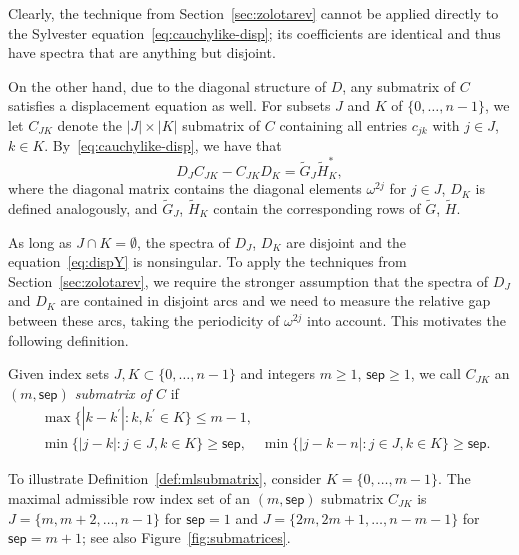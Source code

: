 \documentclass[final,reqno,onefignum,onetabnum]{siamart190516}
\newcommand{\sep}{\mathsf{sep}}
\begin{document}
Clearly, the technique from Section~\ref{sec:zolotarev} cannot be applied directly to the Sylvester equation~\eqref{eq:cauchylike-disp}; its coefficients are identical and thus have spectra that are anything but disjoint. 

On the other hand, due to the diagonal structure of $D$, any submatrix of $C$ satisfies a displacement equation as well. For subsets $J$ and $K$ of $\{0,\ldots,n\!-\!1\}$, we let $C_{JK}$ denote the $|J|\times |K|$ submatrix of $C$ containing all entries $c_{jk}$ with $j\in J$, $k \in K$.
By~\eqref{eq:cauchylike-disp}, we have that
\begin{equation}
\label{eq:dispY}
 D_J C_{JK} - C_{JK} D_K = \widetilde{G}_J \widetilde{H}_K^*,
\end{equation} 
where the diagonal matrix  contains the diagonal elements $\omega^{2j}$ for $j\in J$, $D_K$ is defined analogously, and 
$\widetilde{G}_J$, $\widetilde{H}_K$ contain the corresponding rows of 
$\widetilde{G}$, $\widetilde{H}$.

As long as $J \cap K = \emptyset$, the spectra of $D_J$, $D_K$ are disjoint and the equation~\eqref{eq:dispY} is nonsingular. To apply the techniques from Section~\ref{sec:zolotarev}, we require the stronger assumption that the spectra of $D_J$ and $D_K$ are contained in disjoint arcs and we need to measure the relative gap between these arcs, taking the periodicity of $\omega^{2j}$ into account. This motivates the following definition.
\begin{definition} \label{def:mlsubmatrix}
Given index sets $J, K \subset \{0,\ldots,n\!-\!1\}$ and integers $m \ge 1$, $\sep \ge 1$, we call $C_{JK}$ an \emph{$(m, \sep)$ submatrix of $C$} if 
\begin{align*}
 &\max\{ |k\!-\!k^\prime|: k, k^\prime \in K \} \le m\!-\!1, \\
 &\min\{ |j\!-\!k|: j \in J, k \in K\} \ge \sep, \quad \min\{ |j\!-\!k\!-\!n|: j \in J, k \in K\} \ge \sep.
\end{align*}
\end{definition}
To illustrate Definition~\ref{def:mlsubmatrix}, consider $K = \{0,\ldots,m\!-\!1\}$. The maximal admissible row index set of an $(m, \sep)$ submatrix $C_{JK}$ is $J = \{m,m+2,\ldots,n\!-\!1\}$ for $\sep = 1$ and $J = \{2m,2m\!+\!1,\ldots,n\!-m\!-\!1\}$ for $\sep = m\!+\!1$; see also Figure~\ref{fig:submatrices}.
\end{document}
